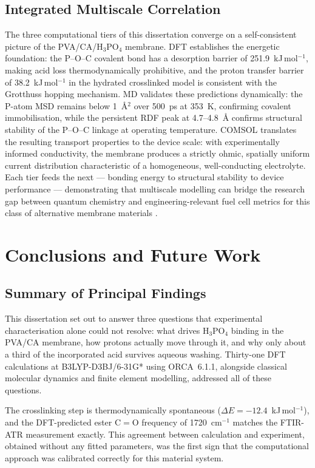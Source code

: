 \documentclass[12pt,a4paper]{report}
\begin{document}
\section{Integrated Multiscale Correlation}

The three computational tiers of this dissertation converge on 
a self-consistent picture of the PVA/CA/H\(_3\)PO\(_4\) membrane. 
DFT establishes the energetic foundation: the P--O--C covalent 
bond has a desorption barrier of 251.9~kJ\,mol\(^{-1}\), making 
acid loss thermodynamically prohibitive, and the proton transfer 
barrier of 38.2~kJ\,mol\(^{-1}\) in the hydrated crosslinked 
model is consistent with the Grotthuss hopping mechanism. MD 
validates these predictions dynamically: the P-atom MSD remains 
below 1~\AA\(^2\) over 500~ps at 353~K, confirming covalent 
immobilisation, while the persistent RDF peak at 4.7--4.8~\AA{} 
confirms structural stability of the P--O--C linkage at operating 
temperature. COMSOL translates the resulting transport properties 
to the device scale: with experimentally informed conductivity, 
the membrane produces a strictly ohmic, spatially uniform current 
distribution characteristic of a homogeneous, well-conducting 
electrolyte. Each tier feeds the next --- bonding energy to 
structural stability to device performance --- demonstrating 
that multiscale modelling can bridge the research gap between quantum 
chemistry and engineering-relevant fuel cell metrics for this 
class of alternative membrane materials \cite{64}.

\chapter{Conclusions and Future Work}

\section{Summary of Principal Findings}

This dissertation set out to answer three questions that 
experimental characterisation alone could not resolve: what 
drives H\(_3\)PO\(_4\) binding in the PVA/CA membrane, how 
protons actually move through it, and why only about a third 
of the incorporated acid survives aqueous washing. Thirty-one 
DFT calculations at B3LYP-D3BJ/6-31G* using ORCA~6.1.1, 
alongside classical molecular dynamics and finite element 
modelling, addressed all of these questions.

The crosslinking step is thermodynamically spontaneous 
($\Delta E = -12.4$~kJ\,mol\(^{-1}\)), and the DFT-predicted 
ester C$=$O frequency of 1720~cm\(^{-1}\) matches the 
FTIR-ATR measurement exactly. This agreement between 
calculation and experiment, obtained without any fitted 
parameters, was the first sign that the computational 
approach was calibrated correctly for this material system.
\end{document}
